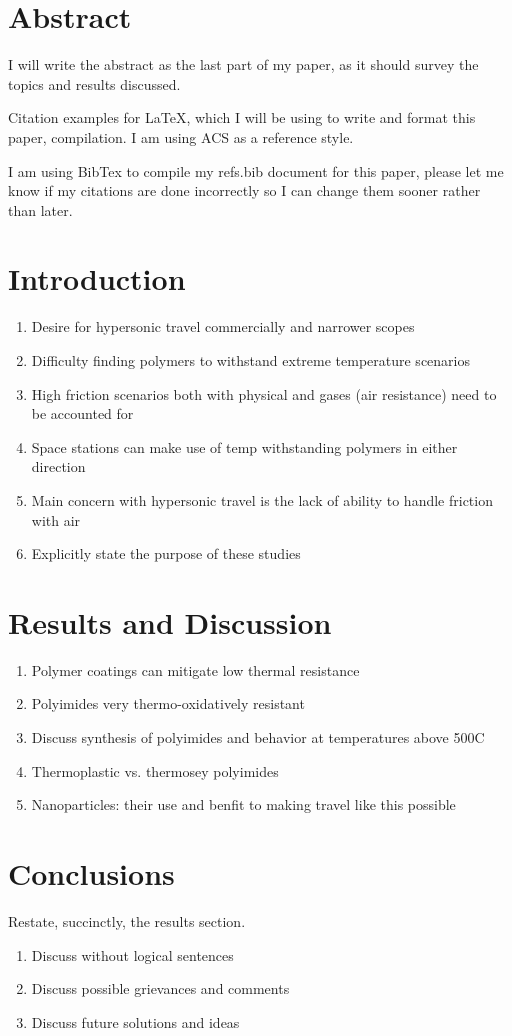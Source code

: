 \documentclass[12pt]{article}
\begin{document}
\section{Abstract}
\indent I will write the abstract as the last part of my paper, as it should survey the topics and results discussed.

\indent Citation examples for LaTeX, which I will be using to write and format this paper, compilation. I am using ACS as a reference style.

\indent I am using BibTex to compile my refs.bib document for this paper, please let me know if my citations are done incorrectly so I can change them sooner rather than later.
\section{Introduction}
	\begin{enumerate}
		\item Desire for hypersonic travel commercially and narrower scopes
		\item Difficulty finding polymers to withstand extreme temperature scenarios
		\item High friction scenarios both with physical and gases (air resistance) need to be accounted for
		\item Space stations can make use of temp withstanding polymers in either direction
		\item Main concern with hypersonic travel is the lack of ability to handle friction with air
		\item Explicitly state the purpose of these studies
	\end{enumerate}
	
\section{Results and Discussion}
	\begin{enumerate}
		\item Polymer coatings can mitigate low thermal resistance
		\item Polyimides very thermo-oxidatively resistant \cite{Dodiok2014}
		\item Discuss synthesis of polyimides and behavior at temperatures above 500\degree C
		\item Thermoplastic vs. thermosey polyimides 
		\item Nanoparticles: their use and benfit to making travel like this possible
	\end{enumerate}
\section{Conclusions}
	Restate, succinctly, the results section.
	\begin{enumerate}
		\item Discuss without logical sentences
		\item Discuss possible grievances and comments
		\item Discuss future solutions and ideas
	\end{enumerate}	 
\end{document}
